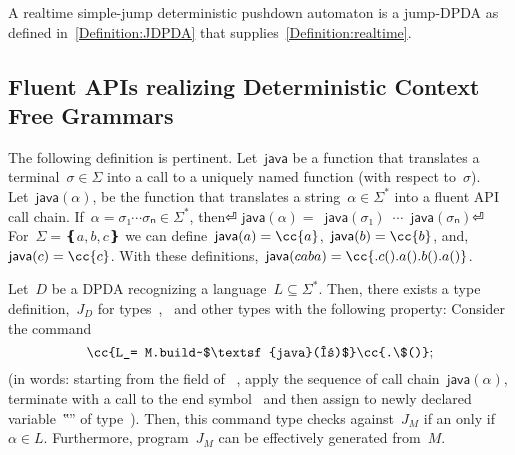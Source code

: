 A realtime simple-jump deterministic pushdown automaton is a jump-DPDA
  as defined in~\cref{Definition:JDPDA}
  that supplies~\cref{Definition:realtime}.

\subsection{Fluent APIs realizing Deterministic Context Free Grammars}
The following definition is pertinent.
Let~$\textsf{java}$ be a function that translates a terminal~$σ∈Σ$
into a call to a uniquely named function (with respect to~$σ$).
Let~$\textsf{java}(α)$, be the function
  that translates a string~$α∈Σ^*$ into a fluent API call chain.
If~$α=σ₁⋯σₙ∈Σ^*$, then⏎
  \mbox{\qquad\qquad}$\textsf{java}(α)=$~$\textsf{java}(σ₁)$~$⋯$~$\textsf{java}(σₙ)$\cc{()}⏎
For~$Σ=❴a,b,c❵$ we can define~$\textsf{java}(a)=\cc{a}$,~$\textsf{java}(b)=\cc{b}$, and,~$\textsf{java}(c)=\cc{c}$.
With these definitions,~$\textsf{java}(caba) = \cc{.c().a().b().a()}$.

\begin{theorem}\label{Theorem:Gil-Levy}
  Let~$D$ be a DPDA recognizing a language~$L⊆Σ^*$.
  Then, there exists a \Java type definition,~$J_D$ for types~,~ and other types with the following
  property: Consider the \Java command
  \[
    \cc{L_= M.build~$\textsf{java}(α)$}\cc{.\$()};
  \]
  (in words: starting from the  field of ~,
  apply the sequence of call chain~$\textsf{java}(α)$, terminate with a call to the
  end symbol~\cc{\$()} and then assign to newly declared variable~‟\cc{\_}” of type~).
  Then, this command type checks against~$J_M$ if an only if~$α∈L$.
  Furthermore, program~$J_M$ can be effectively generated from~$M$.
\end{theorem}
